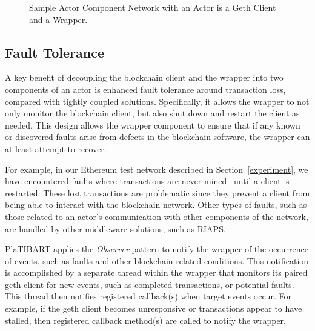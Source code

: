 \begin{figure}[ht]
\vspace{-0.10in}
	\centering
	
    \vspace{-0.05in}
	\caption{Sample Actor Component Network with an Actor is a Geth Client and a Wrapper.}
	\label{fig:network-component-topology}
    \vspace{-0.10in}
\end{figure}

\subsection{Fault Tolerance}

A key benefit of decoupling the blockchain client and the wrapper into two  components of an actor is enhanced fault tolerance around transaction loss, compared with tightly coupled solutions. Specifically, it allows the wrapper to not only monitor the blockchain client, but also shut down and restart the client as needed. This design allows the wrapper component to ensure that if any known or discovered faults arise from defects in the blockchain software, the wrapper can at least attempt to recover. 

For example, in our Ethereum test network described in Section~\ref{experiment}, we have encountered faults where transactions are never mined~\cite{EthereumIssue14893:online} until a client is restarted. These lost transactions are problematic since they prevent a client from being able to interact with the blockchain network. Other types of faults, such as those related to an actor's communication with other components of the network, are handled by other middleware solutions, such as RIAPS.

PlaTIBART applies the \textit{Observer} pattern to notify the wrapper of the occurrence of events, such as faults and other blockchain-related conditions. This notification is accomplished by a separate thread within the wrapper that monitors its paired geth client for new events, such as completed transactions, or potential faults. This thread then notifies registered callback(s) when target events occur. For example, if the geth client becomes unresponsive or transactions appear to have stalled, then registered callback method(s) are called to notify the wrapper. 

